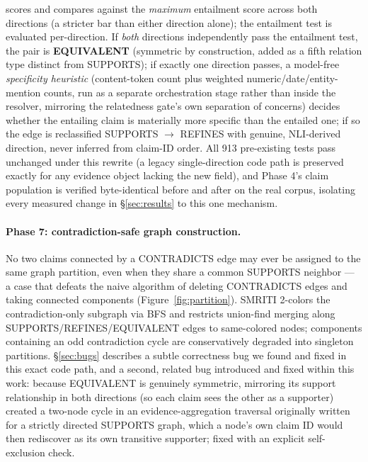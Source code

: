 \begin{enumerate}
    scores and compares against the \emph{maximum} entailment score across
    both directions (a stricter bar than either direction alone); the
    entailment test is evaluated per-direction. If \emph{both} directions
    independently pass the entailment test, the pair is
    \textbf{EQUIVALENT} (symmetric by construction, added as a fifth
    relation type distinct from SUPPORTS); if exactly one direction passes,
    a model-free \emph{specificity heuristic}
    (content-token count plus weighted numeric/date/entity-mention counts,
    run as a separate orchestration stage rather than inside the resolver,
    mirroring the relatedness gate's own separation of concerns) decides
    whether the entailing claim is materially more specific than the
    entailed one; if so the edge is reclassified SUPPORTS $\to$ REFINES
    with genuine, NLI-derived direction, never inferred from claim-ID
    order. All 913 pre-existing tests pass unchanged under this rewrite (a
    legacy single-direction code path is preserved exactly for any evidence
    object lacking the new field), and Phase 4's claim population is
    verified byte-identical before and after on the real corpus, isolating
    every measured change in \S\ref{sec:results} to this one mechanism.
\end{enumerate}

\paragraph{Phase 7: contradiction-safe graph construction.}
\label{sec:phase7}
No two claims connected by a CONTRADICTS edge may ever be assigned to the
same graph partition, even when they share a common SUPPORTS neighbor --- a
case that defeats the naive algorithm of deleting CONTRADICTS edges and
taking connected components (Figure~\ref{fig:partition}). SMRITI 2-colors
the contradiction-only subgraph via BFS and restricts union-find merging
along SUPPORTS/REFINES/EQUIVALENT edges to same-colored nodes; components
containing an odd contradiction cycle are conservatively degraded into
singleton partitions. \S\ref{sec:bugs} describes a subtle correctness bug
we found and fixed in this exact code path, and a second, related bug
introduced and fixed within this work: because EQUIVALENT is genuinely
symmetric, mirroring its support relationship in both directions (so each
claim sees the other as a supporter) created a two-node cycle in an
evidence-aggregation traversal originally written for a strictly directed
SUPPORTS graph, which a node's own claim ID would then rediscover as its
own transitive supporter; fixed with an explicit self-exclusion check.

